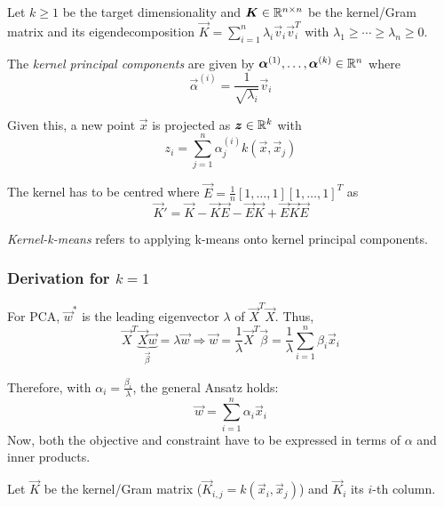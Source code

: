 Let $k \geq 1$ be the target dimensionality
and $\boldsymbol{K} \in \mathbb{R}^{n \times n}$
be the kernel/Gram matrix and its eigendecomposition
$\vec{K} = \sum_{i=1}^n{\lambda_i \vec{v}_i \vec{v}_i^T}$
with $\lambda_1 \geq \dotsb \geq \lambda_n \geq 0$.

The \emph{kernel principal components} are given by
$\boldsymbol{\alpha}^{(1)}, \dotsc, \boldsymbol{\alpha}^{(k)} \in \mathbb{R}^n$
where
\begin{equation*}
    \vec{\alpha}^{(i)} = \frac{1}{\sqrt{\lambda_i}}
    \vec{v}_i
\end{equation*}

Given this, a new point $\vec{x}$ is projected as
$\boldsymbol{z} \in \mathbb{R}^k$ with
\begin{equation*}
    z_i = \sum_{j=1}^n{
        \alpha_j^{(i)} k(\vec{x}, \vec{x}_j)
    }
\end{equation*}

The kernel has to be centred where
$\vec{E} = \frac{1}{n} [1, \dotsc, 1] [1, \dotsc, 1]^T$ as
\begin{equation*}
    \vec{K}' = \vec{K} - \vec{K}\vec{E} - \vec{E}\vec{K} + \vec{E}\vec{K}\vec{E}
\end{equation*}

\emph{Kernel-k-means} refers to applying k-means onto
kernel principal components.


\subsubsection{Derivation for $k=1$}
For PCA, $\vec{w}^*$ is the leading eigenvector $\lambda$
of $\vec{X}^T \vec{X}$.
Thus,
\begin{equation*}
    \vec{X}^T \underbrace{\vec{X} \vec{w}}_{\vec{\beta}}
    = \lambda \vec{w}
    \Rightarrow
    \vec{w} = \frac{1}{\lambda} \vec{X}^T \vec{\beta}
        = \frac{1}{\lambda} \sum_{i=1}^{n}{\beta_i \vec{x}_i}
\end{equation*}

Therefore, with $\alpha_i = \frac{\beta_i}{\lambda}$,
the general Ansatz holds:
\begin{equation*}
    \vec{w} = \sum_{i=1}^n{\alpha_i \vec{x}_i}
\end{equation*}
Now, both the objective and constraint have to be expressed in
terms of $\alpha$ and inner products.

Let $\vec{K}$ be the kernel/Gram matrix
($\vec{K}_{i,j} = k(\vec{x}_i, \vec{x}_j)$)
and $\vec{K}_i$ its $i$-th column.

